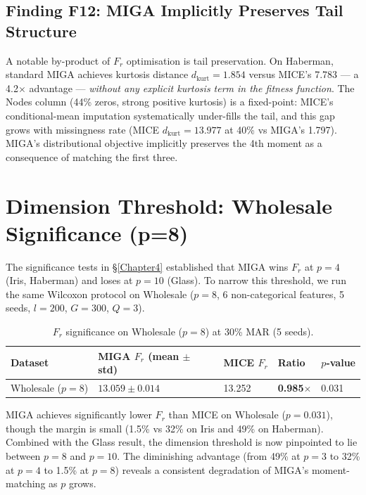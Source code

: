 
\subsection{Finding F12: MIGA Implicitly Preserves Tail Structure}

A notable by-product of $F_r$ optimisation is tail preservation. On Haberman, standard MIGA achieves kurtosis distance $d_{\text{kurt}} = 1.854$ versus MICE's 7.783 --- a 4.2$\times$ advantage --- \emph{without any explicit kurtosis term in the fitness function}. The Nodes column (44\% zeros, strong positive kurtosis) is a fixed-point: MICE's conditional-mean imputation systematically under-fills the tail, and this gap grows with missingness rate (MICE $d_{\text{kurt}} = 13.977$ at 40\% vs MIGA's 1.797). MIGA's distributional objective implicitly preserves the 4th moment as a consequence of matching the first three.


\section{Dimension Threshold: Wholesale Significance (p=8)}
\label{sec:wholesale_sig}

The significance tests in \S\ref{Chapter4} established that MIGA wins $F_r$ at $p=4$ (Iris, Haberman) and loses at $p=10$ (Glass). To narrow this threshold, we run the same Wilcoxon protocol on Wholesale ($p=8$, 6 non-categorical features, 5 seeds, $l=200$, $G=300$, $Q=3$).

\begin{table}[h]
\caption{$F_r$ significance on Wholesale ($p=8$) at 30\% MAR (5 seeds).}
\label{tab:wholesale_sig}
\centering
\begin{tabular}{lllll}
\toprule
\textbf{Dataset} & \textbf{MIGA $F_r$} (mean $\pm$ std) & \textbf{MICE $F_r$} & \textbf{Ratio} & $p$-\textbf{value} \\
\midrule
Wholesale ($p=8$) & $13.059 \pm 0.014$ & 13.252 & \textbf{0.985$\times$} & 0.031 \\
\bottomrule
\end{tabular}
\end{table}

MIGA achieves significantly lower $F_r$ than MICE on Wholesale ($p = 0.031$), though the margin is small (1.5\% vs 32\% on Iris and 49\% on Haberman). Combined with the Glass result, the dimension threshold is now pinpointed to lie between $p=8$ and $p=10$. The diminishing advantage (from 49\% at $p=3$ to 32\% at $p=4$ to 1.5\% at $p=8$) reveals a consistent degradation of MIGA's moment-matching as $p$ grows.

